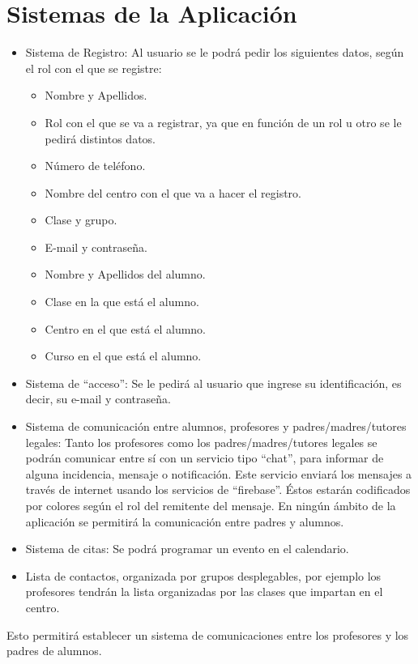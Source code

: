 	\section{Sistemas de la Aplicación}
		\begin{itemize}
			\item Sistema de Registro: Al usuario se le podrá pedir los siguientes datos, según el rol con el que se registre:
			\begin{itemize}
				\item Nombre y Apellidos.
				\item Rol con el que se va a registrar, ya que en función de un rol u otro se le pedirá distintos datos.
				\item Número de teléfono.
				\item Nombre del centro con el que va a hacer el registro.
				\item Clase y grupo.
				\item E-mail y contraseña.
				\item Nombre y Apellidos del alumno.
				\item Clase en la que está el alumno.
				\item Centro en el que está el alumno.
				\item Curso en el que está el alumno.
			\end{itemize}
			\item Sistema de ``acceso'': Se le pedirá al usuario que ingrese su identificación, es decir, su e-mail y contraseña.
			\item Sistema de comunicación entre alumnos, profesores y padres/madres/tutores legales: Tanto los profesores como los padres/madres/tutores legales se podrán comunicar entre sí con un servicio tipo ``chat'', para informar de alguna incidencia, mensaje o notificación. Este servicio enviará los mensajes a través de internet usando los servicios de ``firebase''. Éstos estarán codificados por colores según el rol del remitente del mensaje. En ningún ámbito de la aplicación se permitirá la comunicación entre padres y alumnos.
			\item Sistema de citas: Se podrá programar un evento en el calendario.
			\item Lista de contactos, organizada por grupos desplegables, por ejemplo los profesores tendrán la lista organizadas por las clases que impartan en el centro.
		\end{itemize}
	
		Esto permitirá establecer un sistema de comunicaciones entre los profesores y los padres de alumnos.


